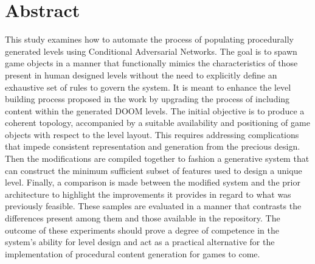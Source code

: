 \documentclass{Configuration_Files/PoliMi3i_thesis}
\begin{document}


\pagestyle{empty} %
\frontmatter %


\startpreamble
\setcounter{page}{1} %

\chapter*{Abstract} 
This study examines how to automate the process of populating procedurally 
generated levels using Conditional Adversarial Networks. The goal is to spawn 
game objects in a manner that functionally mimics the characteristics of those present 
in human designed levels without the need to explicitly define an exhaustive set of
rules to govern the system. It is meant to enhance the level building process 
proposed in the work by upgrading the process of including
content within the generated DOOM levels. The initial objective is to produce a 
coherent topology, accompanied by a suitable availability and positioning of game 
objects with respect to the level layout. This requires addressing complications that 
impede consistent representation and generation from the precious design. Then the 
modifications are compiled together to fashion a generative system that can construct
the minimum sufficient subset of features used to design a unique level. Finally, a 
comparison is made between the modified system and the prior architecture to 
highlight the improvements it provides in regard to what was previously feasible.
These samples are evaluated in a manner that contrasts the differences present 
among them and those available in the repository. The outcome of these experiments 
should prove a degree of competence in the system’s ability for level design and act 
as a practical alternative for the implementation of procedural content generation for 
games to come.
\\
\\
\end{document}
